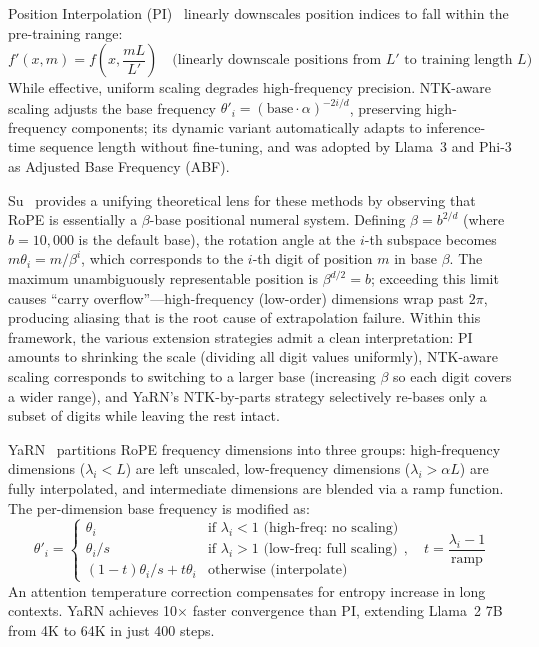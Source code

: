 Position Interpolation (PI)~\cite{chen2023extending} linearly downscales position indices to fall within the pre-training range:
\begin{equation}
f'(x, m) = f\!\left(x, \frac{mL}{L'}\right) \quad \text{(linearly downscale positions from } L' \text{ to training length } L \text{)}
\label{eq:pi}
\end{equation}
While effective, uniform scaling degrades high-frequency precision. NTK-aware scaling adjusts the base frequency $\theta'_i = (\text{base}\cdot\alpha)^{-2i/d}$, preserving high-frequency components; its dynamic variant automatically adapts to inference-time sequence length without fine-tuning, and was adopted by Llama~3 and Phi-3 as Adjusted Base Frequency (ABF).

Su~\cite{su2024roformer} provides a unifying theoretical lens for these methods by observing that RoPE is essentially a $\beta$-base positional numeral system. Defining $\beta = b^{2/d}$ (where $b = 10{,}000$ is the default base), the rotation angle at the $i$-th subspace becomes $m\theta_i = m / \beta^i$, which corresponds to the $i$-th digit of position $m$ in base $\beta$. The maximum unambiguously representable position is $\beta^{d/2} = b$; exceeding this limit causes ``carry overflow''---high-frequency (low-order) dimensions wrap past $2\pi$, producing aliasing that is the root cause of extrapolation failure. Within this framework, the various extension strategies admit a clean interpretation: PI amounts to shrinking the scale (dividing all digit values uniformly), NTK-aware scaling corresponds to switching to a larger base (increasing $\beta$ so each digit covers a wider range), and YaRN's NTK-by-parts strategy selectively re-bases only a subset of digits while leaving the rest intact.

YaRN~\cite{peng2023yarn} partitions RoPE frequency dimensions into three groups: high-frequency dimensions ($\lambda_i < L$) are left unscaled, low-frequency dimensions ($\lambda_i > \alpha L$) are fully interpolated, and intermediate dimensions are blended via a ramp function. The per-dimension base frequency is modified as:
\begin{equation}
\theta'_i = \begin{cases} \theta_i & \text{if } \lambda_i < 1 \text{ (high-freq: no scaling)} \\ \theta_i / s & \text{if } \lambda_i > 1 \text{ (low-freq: full scaling)} \\ (1-t)\theta_i/s + t\theta_i & \text{otherwise (interpolate)} \end{cases}, \quad t = \frac{\lambda_i - 1}{\text{ramp}}
\label{eq:yarn}
\end{equation}
An attention temperature correction compensates for entropy increase in long contexts. YaRN achieves 10$\times$ faster convergence than PI, extending Llama~2 7B from 4K to 64K in just 400 steps.

